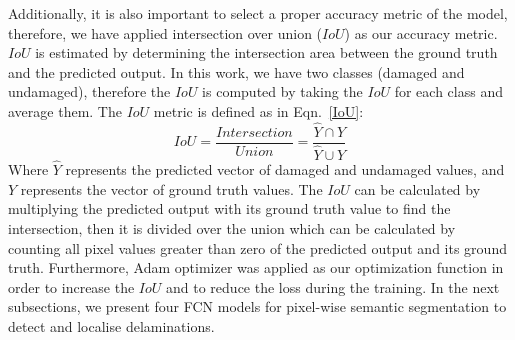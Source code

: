 Additionally, it is also important to select a proper accuracy metric of the model, therefore, we have applied intersection over union (\(IoU\)) as our accuracy metric. 
\(IoU\) is estimated by determining the intersection area between the ground truth and the predicted output.
In this work, we have two classes (damaged and undamaged), therefore the \(IoU\) is computed by taking the \(IoU\) for each class and average them.
The \(IoU\) metric is defined as in Eqn.~\ref{IoU}:
\begin{equation}
IoU = \frac{Intersection}{Union} = \frac{\hat{Y} \cap Y}{\hat{Y} \cup Y} 
\label{IoU}
\end{equation}
Where \(\hat{Y}\) represents the predicted vector of damaged and undamaged values, and \(Y\) represents the vector of ground truth values.
The \(IoU\) can be calculated by multiplying the predicted output with its ground truth value to find the intersection, then it is divided over the union which can be calculated by counting all pixel values greater than zero of the predicted output and its ground truth.
Furthermore, Adam optimizer was applied as our optimization function in order to increase the \(IoU\) and to reduce the loss during the training.
In the next subsections, we present four FCN models for pixel-wise semantic segmentation to detect and localise delaminations.